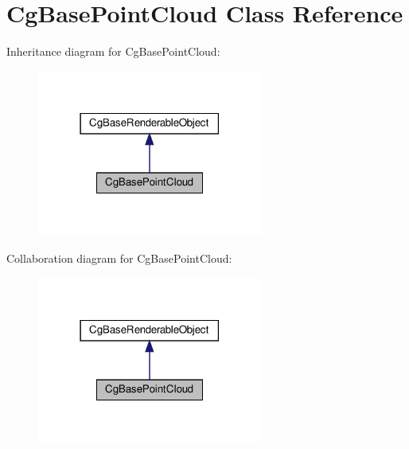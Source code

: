 \hypertarget{class_cg_base_point_cloud}{}\section{Cg\+Base\+Point\+Cloud Class Reference}
\label{class_cg_base_point_cloud}


Inheritance diagram for Cg\+Base\+Point\+Cloud\+:
\nopagebreak
\begin{figure}[H]
\begin{center}
\leavevmode
\includegraphics[width=210pt]{class_cg_base_point_cloud__inherit__graph}
\end{center}
\end{figure}


Collaboration diagram for Cg\+Base\+Point\+Cloud\+:
\nopagebreak
\begin{figure}[H]
\begin{center}
\leavevmode
\includegraphics[width=210pt]{class_cg_base_point_cloud__coll__graph}
\end{center}
\end{figure}
